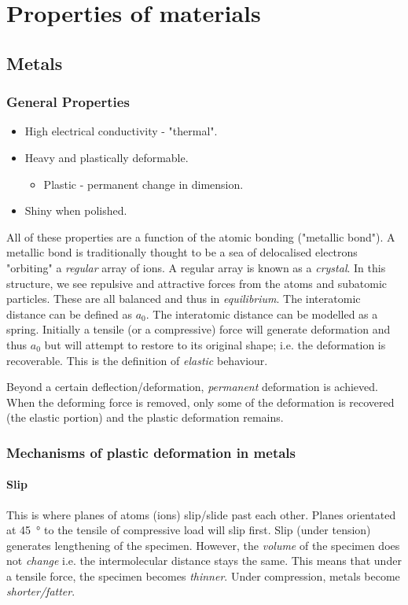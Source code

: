\chapter{Properties of materials}
\section{Metals}
\subsection{General Properties}
\begin{itemize}[noitemsep]
  \item High electrical conductivity - "thermal".
  \item Heavy and plastically deformable.
        \begin{itemize}
          \item Plastic - permanent change in dimension.
        \end{itemize}
  \item Shiny when polished.
\end{itemize}
All of these properties are a function of the atomic bonding ("metallic bond"). A metallic bond is traditionally thought to be a sea of delocalised electrons "orbiting" a \emph{regular} array of ions. A regular array is known as a \emph{crystal}. In this structure, we see repulsive and attractive forces from the atoms and subatomic particles. These are all balanced and thus in \emph{equilibrium}. The interatomic distance can be defined as \( a_0 \). The interatomic distance can be modelled as a spring. Initially a tensile (or a compressive) force will generate deformation and thus \( a_0 \) but will attempt to restore to its original shape; i.e. the deformation is recoverable. This is the definition of \emph{elastic} behaviour.

Beyond a certain deflection/deformation, \emph{permanent} deformation is achieved. When the deforming force is removed, only some of the deformation is recovered (the elastic portion) and the plastic deformation remains.
\subsection{Mechanisms of plastic deformation in metals}
\subsubsection{Slip}
This is where planes of atoms (ions) slip/slide past each other. Planes orientated at \SI{45}{\degree} to the tensile of compressive load will slip first. Slip (under tension) generates lengthening of the specimen. However, the \emph{volume} of the specimen does not \emph{change} i.e. the intermolecular distance stays the same. This means that under a tensile force, the specimen becomes \emph{thinner}. Under compression, metals become \emph{shorter/fatter}.

